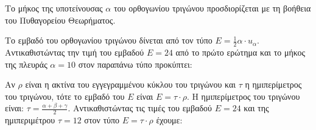 \begin{alist}
    \item %
    \begin{rlist}
        \item Το μήκος της υποτείνουσας $\alpha$ του ορθογωνίου τριγώνου προσδιορίζεται με τη βοήθεια του Πυθαγορείου Θεωρήματος.
        \item Το εμβαδό του ορθογωνίου τριγώνου δίνεται από τον τύπο $E = \frac{1}{2}\alpha \cdot u_{\alpha}$. Αντικαθιστώντας την τιμή του εμβαδού $E=24$ από το πρώτο ερώτημα και το μήκος της πλευράς $\alpha=10$ στον παραπάνω τύπο προκύπτει:
        \item Αν $\rho$ είναι η ακτίνα του εγγεγραμμένου κύκλου του τριγώνου και $\tau$ η ημιπερίμετρος του τριγώνου, τότε το εμβαδό του $E$ είναι $E = \tau \cdot \rho$. Η ημιπερίμετρος του τριγώνου είναι: $\tau = \frac{\alpha+\beta+\gamma}{2}$. Αντικαθιστώντας τις τιμές του εμβαδού $E=24$ και της ημιπεριμέτρου $\tau=12$ στον τύπο $E = \tau \cdot \rho$ έχουμε:
    \end{rlist}
\end{alist}